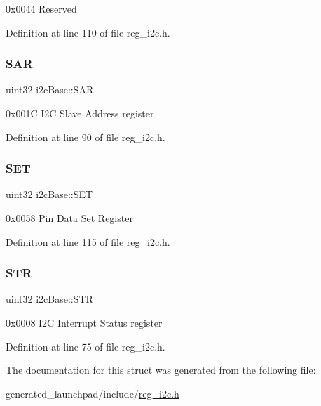 0x0044 Reserved 

Definition at line 110 of file reg\+\_\+i2c.\+h.

\mbox{\label{structi2cBase_a1e6c7b3fec813674897b126a5023a8ac}} 
\subsubsection{\texorpdfstring{S\+AR}{SAR}}
{\footnotesize\ttfamily uint32 i2c\+Base\+::\+S\+AR}

0x001C I2C Slave Address register 

Definition at line 90 of file reg\+\_\+i2c.\+h.

\mbox{\label{structi2cBase_a1b041d2289a5b5840384653151f8b64a}} 
\subsubsection{\texorpdfstring{S\+ET}{SET}}
{\footnotesize\ttfamily uint32 i2c\+Base\+::\+S\+ET}

0x0058 Pin Data Set Register 

Definition at line 115 of file reg\+\_\+i2c.\+h.

\mbox{\label{structi2cBase_ad7d4f7dca32da0bdf0fca5f5cf6c2c58}} 
\subsubsection{\texorpdfstring{S\+TR}{STR}}
{\footnotesize\ttfamily uint32 i2c\+Base\+::\+S\+TR}

0x0008 I2C Interrupt Status register 

Definition at line 75 of file reg\+\_\+i2c.\+h.



The documentation for this struct was generated from the following file\+:\begin{DoxyCompactItemize}
\item 
generated\+\_\+launchpad/include/\mbox{\hyperlink{reg__i2c_8h}{reg\+\_\+i2c.\+h}}\end{DoxyCompactItemize}
